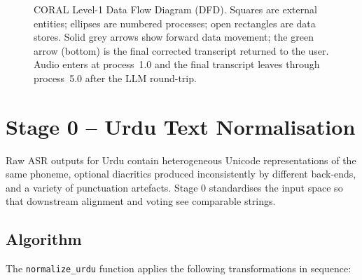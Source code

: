 \begin{figure}[H]
{}
    \caption[CORAL Level-1 data flow diagram]{CORAL Level-1 Data Flow Diagram (DFD). Squares are external entities; ellipses are numbered processes; open rectangles are data stores. Solid grey arrows show forward data movement; the green arrow (bottom) is the final corrected transcript returned to the user. Audio enters at process~1.0 and the final transcript leaves through process~5.0 after the LLM round-trip.}
    \label{fig:coral-dfd}
\end{figure}

\section{Stage 0 -- Urdu Text Normalisation}
\label{sec:stage0}

Raw ASR outputs for Urdu contain heterogeneous Unicode representations of the same phoneme, optional diacritics produced inconsistently by different back-ends, and a variety of punctuation artefacts. Stage 0 standardises the input space so that downstream alignment and voting see comparable strings.

\subsection{Algorithm}
\label{ssec:stage0-algo}

The \texttt{normalize\_urdu} function applies the following transformations in sequence:

